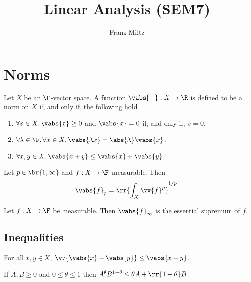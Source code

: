 \documentclass{article}
\begin{document}
\mkthmstwounified
\title{Linear Analysis (SEM7)}
\author{Franz Miltz}
\maketitle
\tableofcontents
\pagebreak

\section{Norms}

\begin{definition}
  Let $X$ be an $\F$-vector space.
  A function $ \vabs{-} : X \to \R$ is defined to be a norm on $X$ if, and only if, the following hold
  \begin{enumerate}
    \item $\forall x\in X.\: \vabs{x}\geq 0$ and $ \vabs{x} = 0$ if, and only if, $x = 0$.
    \item $\forall \lambda\in\F.\:\forall x \in X.\: \vabs{\lambda x} = \abs{\lambda} \vabs{x}$.
    \item $\forall x,y\in X.\: \vabs{x + y} \leq \vabs{x} + \vabs{y}$
  \end{enumerate}
\end{definition}

\begin{definition}
  Let $p\in\br{1,\infty}$ and $f:X\to\F$ measurable. Then
  \begin{align*}
    \vabs{f}_{p} = \rr{\int_X \vv{f}^p}^{1/p}.
  \end{align*}
\end{definition}

\begin{definition}
  Let $f:X\to\F$ be measurable. Then $\vabs{f}_{\infty}$ is the
  essential supremum of $f$.
\end{definition}

\subsection{Inequalities}

\begin{lemma}
  For all $x,y\in X$, $\vv{\vabs{x}-\vabs{y}}\leq \vabs{x-y}$.
\end{lemma}

\begin{theorem}
  If $A,B\geq 0$ and $0\leq\theta\leq 1$ then
  $A^\theta B^{1-\theta} \leq \theta A + \rr{1-\theta}B$.
\end{theorem}
\end{document}
